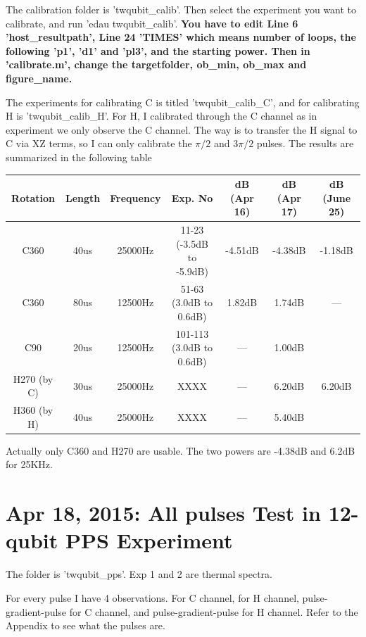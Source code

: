 \documentclass[prl,onecolumn]{revtex4-1}
\begin{document}
The calibration folder is 'twqubit\_calib'. Then select the experiment you want to calibrate, and run 'edau twqubit\_calib'. \textbf{You have to edit Line 6 'host\_resultpath', Line 24 'TIMES' which means number of loops, the following 'p1', 'd1' and 'pl3', and the starting power.  Then in 'calibrate.m', change the targetfolder, ob\_min, ob\_max and figure\_name. }

The experiments for calibrating C is titled 'twqubit\_calib\_C', and for calibrating H is 'twqubit\_calib\_H'. For H, I calibrated through the C channel as in experiment we only observe the C channel. The way is to transfer the H signal to C via XZ terms, so I can only calibrate the $\pi/2$ and $3\pi/2$ pulses. The results are summarized in the following table
\begin{table}[hbtp]
\begin{tabular} {c||c|c|c|c|c|c}
  \hline
  Rotation & Length & Frequency & Exp. No & dB (Apr 16) & dB (Apr 17) & dB (June 25)\\
  \hline
  C360 & 40us & 25000Hz & 11-23 (-3.5dB to -5.9dB) & -4.51dB & -4.38dB & -1.18dB\\
  C360 & 80us & 12500Hz & 51-63 (3.0dB to 0.6dB) & 1.82dB & 1.74dB & ---\\
  C90 & 20us & 12500Hz & 101-113 (3.0dB to 0.6dB) & --- & 1.00dB\\
  H270 (by C) & 30us & 25000Hz & XXXX & --- & 6.20dB & 6.20dB\\
  H360 (by H) & 40us & 25000Hz & XXXX & --- & 5.40dB\\
  \hline
\end{tabular}
\end{table}

Actually only C360 and H270 are usable. The two powers are -4.38dB and 6.2dB for 25KHz.

\newpage
\section{Apr 18, 2015: All pulses Test in 12-qubit PPS Experiment}

The folder is 'twqubit\_pps'. Exp 1 and 2 are thermal spectra.

For every pulse I have 4 observations. For C channel, for H channel, pulse-gradient-pulse for C channel, and pulse-gradient-pulse for H channel. Refer to the Appendix to see what the pulses are.
\end{document}
